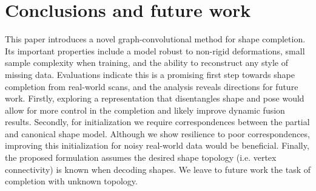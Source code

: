 \section{Conclusions and future work}
This paper introduces a novel graph-convolutional method for shape completion. Its important properties include a model robust to non-rigid deformations, small sample complexity when training, and the ability to reconstruct any style of missing data. Evaluations indicate this is a promising first step towards shape completion from real-world scans, and the analysis reveals directions for future work.
Firstly, exploring a representation that disentangles shape and pose would allow for more control in the completion and likely improve dynamic fusion results.
Secondly, for initialization we require correspondences between the partial and canonical shape model. Although we show resilience to poor correspondences, improving this initialization for noisy real-world data would be beneficial.
Finally, the proposed formulation assumes the desired shape topology (i.e. vertex connectivity) is known when decoding shapes. We leave to future work the task of completion with unknown topology.
